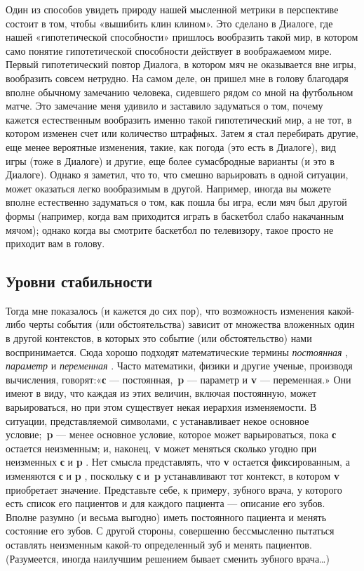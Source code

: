 \documentclass[../main.tex]{subfiles}
\begin{document}
Один из способов увидеть природу нашей мысленной метрики в перспективе состоит в том, чтобы «вышибить клин клином». Это сделано в Диалоге, где нашей «гипотетической способности» пришлось вообразить такой мир, в котором само понятие гипотетической способности действует в воображаемом мире. Первый гипотетический повтор Диалога, в котором мяч не оказывается вне игры, вообразить совсем нетрудно. На самом деле, он пришел мне в голову благодаря вполне обычному замечанию человека, сидевшего рядом со мной на футбольном матче. Это замечание меня удивило и заставило задуматься о том, почему кажется естественным вообразить именно такой гипотетический мир, а не тот, в котором изменен счет или количество штрафных. Затем я стал перебирать другие, еще менее вероятные изменения, такие, как погода (это есть в Диалоге), вид игры (тоже в Диалоге) и другие, еще более сумасбродные варианты (и это в Диалоге). Однако я заметил, что то, что смешно варьировать в одной ситуации, может оказаться легко вообразимым в другой. Например, иногда вы можете вполне естественно задуматься о том, как пошла бы игра, если мяч был другой формы (например, когда вам приходится играть в баскетбол слабо накачанным мячом); однако когда вы смотрите баскетбол по телевизору, такое просто не приходит вам в голову.


\subsection{Уровни стабильности}

Тогда мне показалось (и кажется до сих пор), что возможность изменения какой-либо черты события (или обстоятельства) зависит от множества вложенных один в другой контекстов, в которых это событие (или обстоятельство) нами воспринимается. Сюда хорошо подходят математические термины \emph{постоянная} , \emph{параметр} и \emph{переменная} . Часто математики, физики и другие ученые, производя вычисления, говорят:«\textbf{с} --- постоянная,~\textbf{p} --- параметр и \textbf{v} --- переменная.» Они имеют в виду, что каждая из этих величин, включая постоянную, может варьироваться, но при этом существует некая иерархия изменяемости. В ситуации, представляемой символами, с устанавливает некое основное условие;~\textbf{p} --- менее основное условие, которое может варьироваться, пока \textbf{с} остается неизменным; и, наконец, \textbf{v} может меняться сколько угодно при неизменных \textbf{с} и \textbf{p} . Нет смысла представлять, что \textbf{v} остается фиксированным, а изменяются \textbf{с} и \textbf{p} , поскольку \textbf{с} и~\textbf{p} устанавливают тот контекст, в котором \textbf{v} приобретает значение. Представьте себе, к примеру, зубного врача, у которого есть список его пациентов и для каждого пациента --- описание его зубов. Вполне разумно (и весьма выгодно) иметь постоянного пациента и менять состояние его зубов. С другой стороны, совершенно бессмысленно пытаться оставлять неизменным какой-то определенный зуб и менять пациентов. (Разумеется, иногда наилучшим решением бывает сменить зубного врача\ldots)
\end{document}
